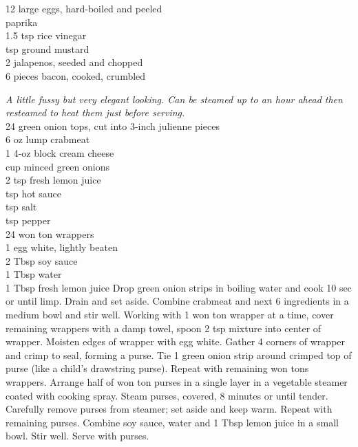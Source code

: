 \begin{minipage}{\linewidth}
\end{minipage}\par\begin{minipage}{\linewidth}   
	\step
	{12 large eggs, hard-boiled and peeled\\
	 paprika\\
	 1.5 tsp rice vinegar	\\
	  tsp ground mustard \\
	 2 jalapenos, seeded and chopped	\\
	 6 pieces bacon, cooked, crumbled
		}{}
		
\end{minipage}\par\begin{minipage}{\linewidth} 
\textit{A little fussy but very elegant looking. Can be steamed up to an hour ahead then resteamed to heat them just before serving.} \\
	\step
	{24 green onion tops, cut into 3-inch julienne pieces	 \\
	 6 oz lump crabmeat	 \\
	 1  4-oz block cream cheese \\	
	  cup minced green onions	 \\
	 2 tsp fresh lemon juice \\
	  tsp hot sauce	 \\
	  tsp salt \\
	  tsp pepper	 \\
	 24 won ton wrappers \\
	 1 egg white, lightly beaten	 \\
	 2 Tbsp soy sauce \\
	 1 Tbsp water	 \\
	 1 Tbsp fresh lemon juice	
		}{
Drop green onion strips in boiling water and cook 10 sec or until limp. Drain and set aside. Combine crabmeat and next 6 ingredients in a medium bowl and stir well. Working with 1 won ton wrapper at a time, cover remaining wrappers with a damp towel, spoon 2 tsp mixture into center of wrapper. Moisten edges of wrapper with egg white. Gather 4 corners of wrapper and crimp to seal, forming a purse. Tie 1 green onion strip around crimped top of purse (like a child's drawstring purse). Repeat with remaining won tons wrappers. Arrange half of won ton purses in a single layer in a vegetable steamer coated with cooking spray. Steam purses, covered, 8 minutes or until tender. Carefully remove purses from steamer; set aside and keep warm. Repeat with remaining purses. Combine soy sauce, water and 1 Tbsp lemon juice in a small bowl. Stir well. Serve with purses.}


\end{minipage}
